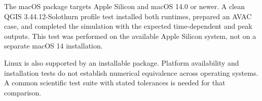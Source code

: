 \documentclass[11pt,a4paper]{article}
\begin{document}
The macOS package targets Apple Silicon and macOS 14.0 or newer. A clean QGIS
3.44.12-Solothurn profile test installed both runtimes, prepared an AVAC case,
and completed the simulation with the expected time-dependent and peak
outputs. This test was performed on the available Apple Silicon system,
not on a separate macOS 14 installation.

Linux is also supported by an installable package. Platform availability and
installation tests do not establish numerical equivalence across operating
systems. A common scientific test suite with stated tolerances is needed for
that comparison.

\newpage


\end{document}

